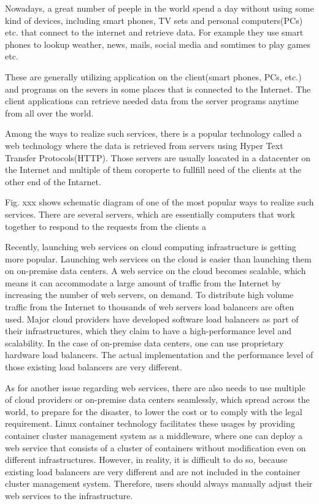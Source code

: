 Nowadays, a great number of peeple in the world spend a day without using some kind of devices, including smart phones, TV sets and personal computers(PCs) etc. that connect to the internet and retrieve data.
For example they use smart phones to lookup weather, news, mails, social media and somtimes to play games etc.

These are generally utilizing application on the client(smart phones, PCs, etc.) and programs on the severs in some places that is connected to the Internet.
The client applications can retrieve needed data from the server programs anytime from all over the world.

Among the ways to realize such services, there is a popular technology called a web technology where the data is retrieved from servers using Hyper Text Transfer Protocols(HTTP).
Those servers are usually loacated in a datacenter on the Internet and multiple of them coroperte to fullfill need of the clients at the other end of the Intarnet. 

Fig. xxx shows schematic diagram of one of the most popular ways to realize such services. 
There are several servers, which are essentially computers that work together to respond to the requests from the clients a 





Recently, launching web services on cloud computing infrastructure is getting more popular.
Launching web services on the cloud is easier than launching them on on-premise data centers.
A web service on the cloud becomes scalable, which means it can accommodate a large amount of traffic from the Internet by increasing the number of web servers, on demand.
To distribute high volume traffic from the Internet to thousands of web servers load balancers are often used.
Major cloud providers have developed software load balancers\cite{eisenbud2016maglev,patel2013ananta} as part of their infrastructures, which they claim to have a high-performance level and scalability.
In the case of on-premise data centers, one can use proprietary hardware load balancers.
The actual implementation and the performance level of those existing load balancers are very different.

As for another issue regarding web services,
there are also needs to use multiple of cloud providers or on-premise data centers seamlessly, which spread across the world, to prepare for the disaster, to lower the cost or to comply with the legal requirement.
Linux container technology\cite{menage2007adding} facilitates these usages by providing container cluster management system as a middleware,
where one can deploy a web service that consists of a cluster of containers without modification even on different infrastructures.
However, in reality, it is difficult to do so, because existing load balancers are very different and are not included in the container cluster management system.
Therefore, users should always manually adjust their web services to the infrastructure.


